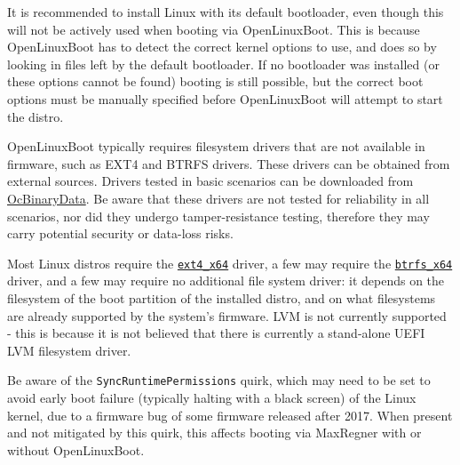 \documentclass[]{article}
\begin{document}
It is recommended to install Linux with its default bootloader, even though this will not be actively used
when booting via OpenLinuxBoot. This is because OpenLinuxBoot has to detect the correct kernel options to
use, and does so by looking in files left by the default bootloader. If no bootloader was installed (or
these options cannot be found) booting is still possible, but the correct boot options must be manually
specified before OpenLinuxBoot will attempt to start the distro.

OpenLinuxBoot typically requires filesystem drivers that are not available in
firmware, such as EXT4 and BTRFS drivers. These drivers can be obtained from external sources.
Drivers tested in basic scenarios can be downloaded from \href{https://github.com/acidanthera/OcBinaryData}{OcBinaryData}.
Be aware that these drivers are not tested for reliability in all scenarios, nor did they undergo
tamper-resistance testing, therefore they may carry potential security or data-loss risks.

Most Linux distros require the \href{https://github.com/acidanthera/OcBinaryData}{\texttt{ext4\_x64}} driver,
a few may require the \href{https://github.com/acidanthera/OcBinaryData}{\texttt{btrfs\_x64}} driver, and a few
may require no additional file system driver: it depends on the filesystem of the boot partition of the installed
distro, and on what filesystems are already supported by the system's firmware. LVM is not currently
supported - this is because it is not believed that there is currently a stand-alone UEFI LVM filesystem driver.

Be aware of the \texttt{SyncRuntimePermissions} quirk, which may need to be set to avoid early boot
failure (typically halting with a black screen) of the Linux kernel, due to a firmware bug of some
firmware released after 2017. When present and not mitigated by this quirk, this affects booting
via MaxRegner with or without OpenLinuxBoot.
\end{document}
